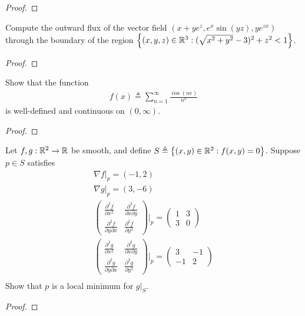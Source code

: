 \documentclass{report}
\begin{document}
\begin{proof}

\end{proof}
\begin{question}{}{}
Compute the outward flux of the vector field $(x+ye^z,e^x \sin (yz),ye^{zx})$ through the boundary of the region $\left\{ (x,y,z)\in\mathbb{R}^3: (\sqrt{x^2+y^2}-3 )^2+z^2<1 \right\}$. 
\end{question}
\begin{proof}

\end{proof}
\begin{question}{}{}
Show that the function 
\begin{align*}
f(x)\triangleq \sum_{n=1}^{\infty}  \frac{\cos (ne)}{n^x}
\end{align*}
is well-defined and continuous on $(0,\infty)$. 
\end{question}
\begin{proof}

\end{proof}
\begin{question}{}{}
Let $f,g:\mathbb{R}^2 \rightarrow \mathbb{R}$ be smooth, and define $S\triangleq \left\{ (x,y)\in\mathbb{R}^2: f(x,y)=0 \right\}$. Suppose $p \in S$ satisfies 
\begin{align*}
\nabla f|_p= (-1,2)\\
\nabla g |_p = (3,-6) \\
\begin{pmatrix} 
  \frac{\partial ^2 f}{\partial x^2} & \frac{\partial ^2 f}{\partial x \partial y} \\
  \frac{\partial ^2 f}{\partial y \partial x} & \frac{\partial ^2 f}{\partial y^2}
\end{pmatrix} \Bigg|_p = \begin{pmatrix} 
 1 & 3 \\
 3 & 0
\end{pmatrix}  \\
\begin{pmatrix} 
  \frac{\partial ^2 g}{\partial x^2} & \frac{\partial ^2 g}{\partial x \partial y} \\
  \frac{\partial ^2 g}{\partial y \partial x} & \frac{\partial ^2 g}{\partial y^2}
\end{pmatrix} \Bigg|_p = \begin{pmatrix} 
 3 & -1 \\
 -1 & 2
\end{pmatrix}  \\
\end{align*}
Show that $p$ is a local minimum for  $g|_S$. 
\end{question}
\begin{proof}

\end{proof}
\end{document}

